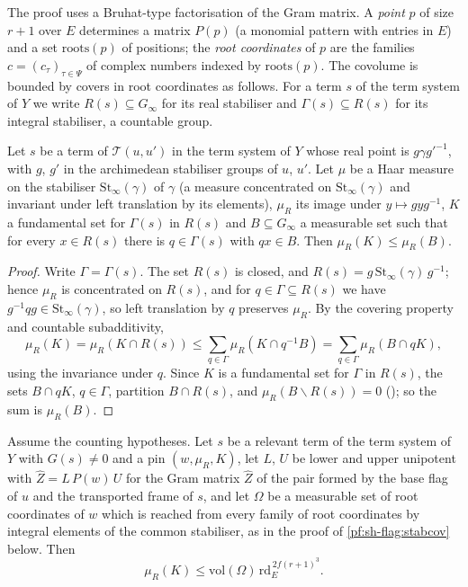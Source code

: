 The proof uses a Bruhat-type factorisation of the Gram matrix. A \emph{point} $p$ of size $r+1$ over $E$ determines a
matrix $P(p)$ (a monomial pattern with entries in $E$) and a set $\mathrm{roots}(p)$ of positions; the \emph{root
coordinates} of $p$ are the families $c=(c_\tau)_{\tau\in\Psi}$ of complex numbers indexed by $\mathrm{roots}(p)$. The covolume is
bounded by covers in root coordinates as follows. For a term $s$ of the term system of $Y$ we write $R(s)\subseteq G_\infty$ for its
real stabiliser and $\Gamma(s)\subseteq R(s)$ for its integral stabiliser, a countable group.

\begin{lemma}\label{pf:sh-flag:packpinned}
Let $s$ be a term of $\mathcal T(u,u')$ in the term system of $Y$ whose real point is $g\gamma g'^{-1}$, with $g$, $g'$ in the
archimedean stabiliser groups of $u$, $u'$. Let $\mu$ be a Haar measure on the stabiliser $\mathrm{St}_\infty(\gamma)$ of $\gamma$
(a measure concentrated on $\mathrm{St}_\infty(\gamma)$ and invariant under left translation by its elements), $\mu_R$ its image under
$y\mapsto gyg^{-1}$, $K$ a fundamental set for $\Gamma(s)$ in $R(s)$ and $B\subseteq G_\infty$ a measurable set such that for every $x\in R(s)$
there is $q\in\Gamma(s)$ with $qx\in B$. Then $\mu_R(K)\le\mu_R(B)$.
\end{lemma}

\begin{proof}
Write $\Gamma=\Gamma(s)$. The set $R(s)$ is closed, and $R(s)=g\,\mathrm{St}_\infty(\gamma)\,g^{-1}$; hence $\mu_R$ is concentrated on $R(s)$,
and for $q\in\Gamma\subseteq R(s)$ we have $g^{-1}qg\in\mathrm{St}_\infty(\gamma)$, so left translation by $q$ preserves $\mu_R$. By the
covering property and countable subadditivity,
\[
\mu_R(K)=\mu_R(K\cap R(s))\le\sum_{q\in\Gamma}\mu_R(K\cap q^{-1}B)=\sum_{q\in\Gamma}\mu_R(B\cap qK),
\]
using the invariance under $q$. Since $K$ is a fundamental set for $\Gamma$ in $R(s)$, the sets $B\cap qK$, $q\in\Gamma$, partition $B\cap R(s)$,
and $\mu_R(B\smallsetminus R(s))=0$ (); so the sum is $\mu_R(B)$.
\end{proof}

\begin{lemma}\label{pf:sh-flag:cover}
Assume the counting hypotheses. Let $s$ be a relevant term of the term system of $Y$ with $G(s)\ne0$ and a pin $(w,\mu_R,K)$, let $L$, $U$
be lower and upper unipotent with $\widehat Z=L\,P(w)\,U$ for the Gram matrix $\widehat Z$ of the pair formed by the base flag of $u$ and the
transported frame of $s$, and let $\Omega$ be a measurable set of root coordinates of $w$ which is reached from every family of root
coordinates by integral elements of the common stabiliser, as in the proof of \cref{pf:sh-flag:stabcov} below. Then
\[
\mu_R(K)\le\mathrm{vol}(\Omega)\,\mathrm{rd}_E^{\,2f(r+1)^3}.
\]
\end{lemma}

